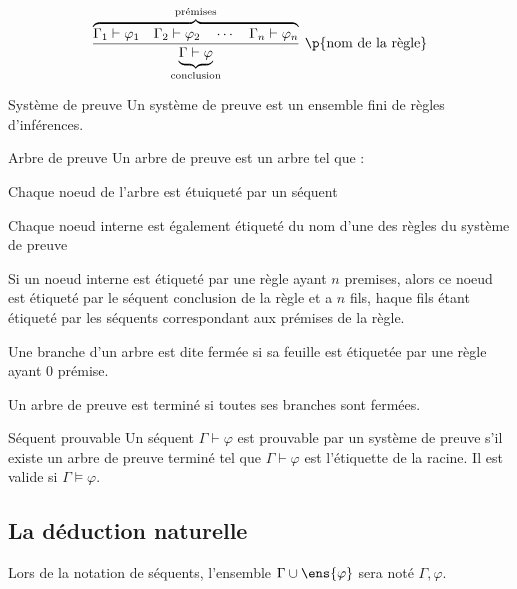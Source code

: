     \begin{notation}
        \[ \dfrac{\overbrace{\Gamma_1 \vdash \varphi_1 \quad \Gamma_2 \vdash \varphi_2 \quad \cdots \quad \Gamma_n \vdash \varphi_n}^{\text{prémises}}}{\underbrace{\Gamma \vdash \varphi}_{\text{conclusion}}} \ \p{\text{nom de la règle}}\]
    \end{notation}
    
    \begin{definition}{Système de preuve}{}
        Un système de preuve est un ensemble fini de règles d'inférences.
    \end{definition}
    
    \begin{definition}{Arbre de preuve}{}
        Un arbre de preuve est un arbre tel que :
        \begin{enumerate}
            \ithand Chaque noeud de l'arbre est étuiqueté par un séquent
            
            \ithand Chaque noeud interne est également étiqueté du nom d'une des règles du système de preuve
            
            \ithand Si un noeud interne est étiqueté par une règle ayant $n$ premises, alors ce noeud est étiqueté par le séquent conclusion de la règle et a $n$ fils, haque fils étant étiqueté par les séquents correspondant aux prémises de la règle.
            
            \ithand Une branche d'un arbre est dite fermée si sa feuille est étiquetée par une règle ayant $0$ prémise.
            
            \ithand Un arbre de preuve est terminé si toutes ses branches sont fermées.
        \end{enumerate}
    \end{definition}
    
    \begin{definition}{Séquent prouvable}{}
        Un séquent $\Gamma \vdash \varphi$ est prouvable par un système de preuve s'il existe un arbre de preuve terminé tel que $\Gamma \vdash \varphi$ est l'étiquette de la racine. Il est valide si $\Gamma \vDash \varphi$.
    \end{definition}
    
    \subsection{La déduction naturelle}
    
    Lors de la notation de séquents, l'ensemble $\Gamma \cup \ens{\varphi}$ sera noté $\Gamma, \varphi$.
    
